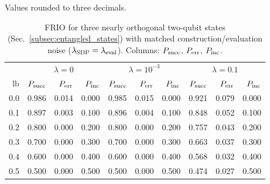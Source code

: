 \begin{table}[t]
    \par\vspace{2pt}\footnotesize
    Values rounded to three decimals.
\end{table}

\begin{table}[t]
    \centering
    \caption{FRIO for three nearly orthogonal two-qubit states (Sec.~\ref{subsec:entangled_states}) with matched construction/evaluation noise (\(\lambda_{\mathrm{SDP}}=\lambda_{\mathrm{eval}}\)). Columns: \(P_{\mathrm{succ}}\), \(P_{\mathrm{err}}\), \(P_{\mathrm{inc}}\).}
    \label{tab:frio_three_states}
    \footnotesize
    \setlength{\tabcolsep}{4pt}%
    \renewcommand{\arraystretch}{1.08}%
    \begin{tabular}{@{}r|rrr|rrr|rrr@{}}
        \toprule
                                                 & \multicolumn{3}{c|}{\(\lambda=0\)} &
        \multicolumn{3}{c|}{\(\lambda=10^{-3}\)} &
        \multicolumn{3}{c}{\(\lambda=0.1\)}                                                                                                                   \\
        \(\text{lb}\)                            & \(P_{\mathrm{succ}}\)                         & \(P_{\mathrm{err}}\) & \(P_{\mathrm{inc}}\) &
        \(P_{\mathrm{succ}}\)                               & \(P_{\mathrm{err}}\)                          & \(P_{\mathrm{inc}}\) &
        \(P_{\mathrm{succ}}\)                               & \(P_{\mathrm{err}}\)                          & \(P_{\mathrm{inc}}\)                                                             \\
        \midrule
        0.0                                      & 0.986                              & 0.014     & 0.000     & 0.985 & 0.015 & 0.000 & 0.921 & 0.079 & 0.000 \\
        0.1                                      & 0.897                              & 0.003     & 0.100     & 0.896 & 0.004 & 0.100 & 0.848 & 0.052 & 0.100 \\
        0.2                                      & 0.800                              & 0.000     & 0.200     & 0.800 & 0.000 & 0.200 & 0.757 & 0.043 & 0.200 \\
        0.3                                      & 0.700                              & 0.000     & 0.300     & 0.700 & 0.000 & 0.300 & 0.663 & 0.037 & 0.300 \\
        0.4                                      & 0.600                              & 0.000     & 0.400     & 0.600 & 0.000 & 0.400 & 0.568 & 0.032 & 0.400 \\
        0.5                                      & 0.500                              & 0.000     & 0.500     & 0.500 & 0.000 & 0.500 & 0.474 & 0.027 & 0.500 \\

\end{tabular}
\end{table}
